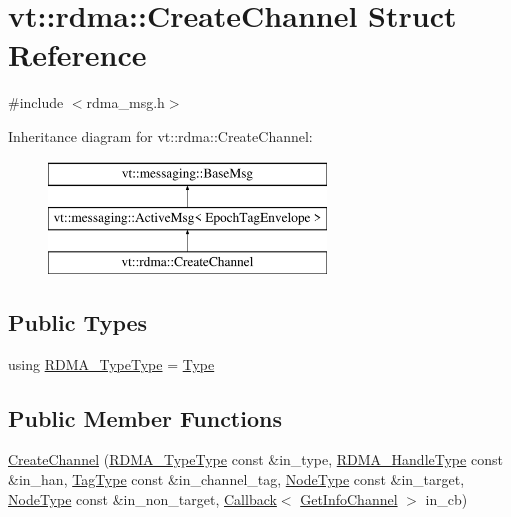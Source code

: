 \hypertarget{structvt_1_1rdma_1_1_create_channel}{}\section{vt\+:\+:rdma\+:\+:Create\+Channel Struct Reference}
\label{structvt_1_1rdma_1_1_create_channel}


{\ttfamily \#include $<$rdma\+\_\+msg.\+h$>$}

Inheritance diagram for vt\+:\+:rdma\+:\+:Create\+Channel\+:\begin{figure}[H]
\begin{center}
\leavevmode
\includegraphics[height=3.000000cm]{structvt_1_1rdma_1_1_create_channel}
\end{center}
\end{figure}
\subsection*{Public Types}
\begin{DoxyCompactItemize}
\item 
using \hyperlink{structvt_1_1rdma_1_1_create_channel_ae16004f4d4886e470c8e896fca551afd}{R\+D\+M\+A\+\_\+\+Type\+Type} = \hyperlink{namespacevt_1_1rdma_ac848e1d9da43db6294bd06f83e5d3946}{Type}
\end{DoxyCompactItemize}
\subsection*{Public Member Functions}
\begin{DoxyCompactItemize}
\item 
\hyperlink{structvt_1_1rdma_1_1_create_channel_ad3c3265c63c536dfb68e30886438bdf8}{Create\+Channel} (\hyperlink{namespacevt_1_1rdma_ac848e1d9da43db6294bd06f83e5d3946}{R\+D\+M\+A\+\_\+\+Type\+Type} const \&in\+\_\+type, \hyperlink{namespacevt_a10442579ec4e7ebef223818e64bcf908}{R\+D\+M\+A\+\_\+\+Handle\+Type} const \&in\+\_\+han, \hyperlink{namespacevt_a84ab281dae04a52a4b243d6bf62d0e52}{Tag\+Type} const \&in\+\_\+channel\+\_\+tag, \hyperlink{namespacevt_a866da9d0efc19c0a1ce79e9e492f47e2}{Node\+Type} const \&in\+\_\+target, \hyperlink{namespacevt_a866da9d0efc19c0a1ce79e9e492f47e2}{Node\+Type} const \&in\+\_\+non\+\_\+target, \hyperlink{namespacevt_a57b238783d05de96bc2c4027f7073b7f}{Callback}$<$ \hyperlink{structvt_1_1rdma_1_1_get_info_channel}{Get\+Info\+Channel} $>$ in\+\_\+cb)
\end{DoxyCompactItemize}
